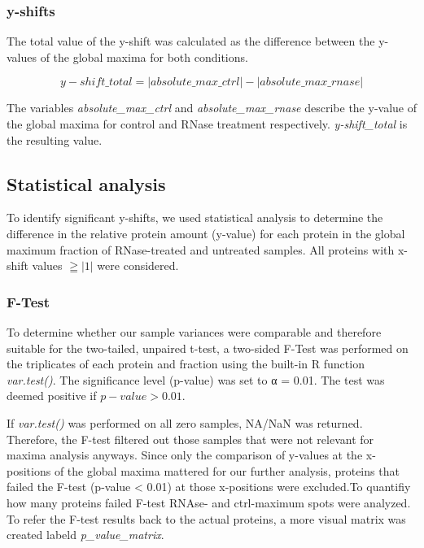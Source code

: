 \documentclass[
]{article}
\begin{document}
\hypertarget{y-shifts}{%
\subsubsection{y-shifts}\label{y-shifts}}

The total value of the y-shift was calculated as the difference between
the y-values of the global maxima for both conditions.

\[y-shift\_total = |absolute\_max\_ctrl| - |absolute\_max\_rnase|\]

The variables \emph{absolute\_max\_ctrl} and \emph{absolute\_max\_rnase}
describe the y-value of the global maxima for control and RNase
treatment respectively. \emph{y-shift\_total} is the resulting value.

\hypertarget{statistical-analysis}{%
\subsection{Statistical analysis}\label{statistical-analysis}}

To identify significant y-shifts, we used statistical analysis to
determine the difference in the relative protein amount (y-value) for
each protein in the global maximum fraction of RNase-treated and
untreated samples. All proteins with x-shift values \(\geqq |1|\) were
considered.

\hypertarget{f-test}{%
\subsubsection{F-Test}\label{f-test}}

To determine whether our sample variances were comparable and therefore
suitable for the two-tailed, unpaired t-test, a two-sided F-Test was
performed on the triplicates of each protein and fraction using the
built-in R function \emph{var.test()}. The significance level (p-value)
was set to α = 0.01. The test was deemed positive if \(p-value > 0.01\).

If \emph{var.test()} was performed on all zero samples, NA/NaN was
returned. Therefore, the F-test filtered out those samples that were not
relevant for maxima analysis anyways. Since only the comparison of
y-values at the x-positions of the global maxima mattered for our
further analysis, proteins that failed the F-test (p-value \textless{}
0.01) at those x-positions were excluded.To quantifiy how many proteins
failed F-test RNAse- and ctrl-maximum spots were analyzed. To refer the
F-test results back to the actual proteins, a more visual matrix was
created labeld \emph{p\_value\_matrix}.
\end{document}
